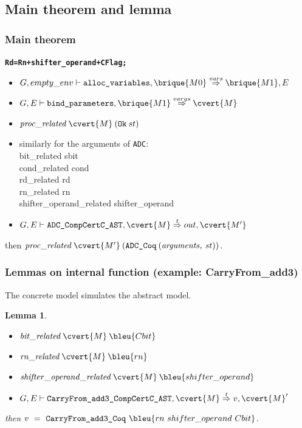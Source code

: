 \documentclass[usenames,dvipsnames]{beamer} %
\newtheorem{lem}{Lemma} %
\begin{document}
\subsection{Main theorem and lemma}
\begin{frame}[fragile]
\frametitle{Main theorem}
\begin{alltt}
\textbf{Rd = Rn + shifter_operand + C Flag;}
\end{alltt}
\begin{theorem}
\begin{itemize}
\item $G,empty\_env\vdash \texttt{alloc\_variables},\brique{M0}\overset{vars}{\Rightarrow}\brique{M1},E$
\item $G,E \vdash \texttt{bind\_parameters},\brique{M1} \overset{vargs}{\Rightarrow}\cvert{M}$
\item $\mathit{proc\_related} \: \cvert{M} \: (\texttt{Ok}\: st)$
\item similarly for the arguments of \texttt{ADC}:\\
  bit\_related  \:  sbit\\
  cond\_related  \: cond\\
  rd\_related  \: rd\\
  rn\_related  \: rn\\
  shifter\_operand\_related  \: shifter\_operand
\item 
  $G,E\vdash \texttt{ADC\_CompCertC\_AST},\cvert{M}\overset{t}{\Rightarrow}out,\cvert{M'}$
\end{itemize}
then $\mathit{proc\_related}\: \cvert{M'} \:(\texttt{ADC\_Coq}\: (\mathit{arguments},\:st))$.
\end{theorem}
\end{frame}

\begin{frame}
\frametitle{Lemmas on internal function (example: CarryFrom\_add3)}The concrete model simulates the abstract model.
\begin{lem}
\begin{itemize}
\item $\mathit{bit\_related} \:\cvert{M} \: \bleu{Cbit}$
\item $\mathit{rn\_related} \:\cvert{M} \: \bleu{rn}$
\item $\mathit{shifter\_operand\_related} \:\cvert{M} \: \bleu{shifter\_operand}$
\item $G,E\vdash \texttt{CarryFrom\_add3\_CompCertC\_AST},\cvert{M}\overset{t}{\Rightarrow}v,\cvert{M}'$
\end{itemize}
then $v~=~\texttt{CarryFrom\_add3\_Coq}~\bleu{rn~shifter\_operand~Cbit}$.
\end{lem}
\end{frame}
\end{document}
